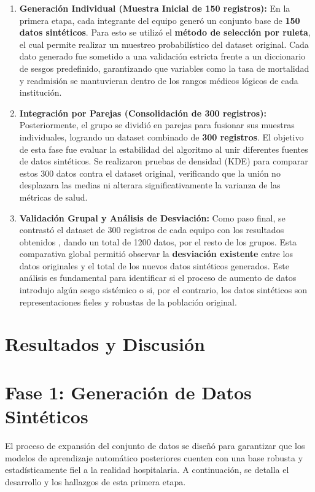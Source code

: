 \documentclass[12pt]{article}
\begin{document}
\begin{enumerate}
    \item \textbf{Generación Individual (Muestra Inicial de 150 registros):} 
    En la primera etapa, cada integrante del equipo generó un conjunto base de \textbf{150 datos sintéticos}. Para esto se utilizó el \textbf{método de selección por ruleta}, el cual permite realizar un muestreo probabilístico del dataset original. Cada dato generado fue sometido a una validación estricta frente a un diccionario de sesgos predefinido, garantizando que variables como la tasa de mortalidad y readmisión se mantuvieran dentro de los rangos médicos lógicos de cada institución.

    \item \textbf{Integración por Parejas (Consolidación de 300 registros):} 
    Posteriormente, el grupo se dividió en parejas para fusionar sus muestras individuales, logrando un dataset combinado de \textbf{300 registros}. El objetivo de esta fase fue evaluar la estabilidad del algoritmo al unir diferentes fuentes de datos sintéticos. Se realizaron pruebas de densidad (KDE) para comparar estos 300 datos contra el dataset original, verificando que la unión no desplazara las medias ni alterara significativamente la varianza de las métricas de salud.

    \item \textbf{Validación Grupal y Análisis de Desviación:} 
    Como paso final, se contrastó el dataset de 300 registros de cada equipo con los resultados obtenidos , dando un total de 1200 datos, por el resto de los grupos. Esta comparativa global permitió observar la \textbf{desviación existente} entre los datos originales y el total de los nuevos datos sintéticos generados. Este análisis es fundamental para identificar si el proceso de aumento de datos introdujo algún sesgo sistémico o si, por el contrario, los datos sintéticos son representaciones fieles y robustas de la población original.
\end{enumerate}

\section{Resultados y Discusión}

\section*{Fase 1: Generación de Datos Sintéticos}

El proceso de expansión del conjunto de datos se diseñó para garantizar que los modelos de aprendizaje automático posteriores cuenten con una base robusta y estadísticamente fiel a la realidad hospitalaria. A continuación, se detalla el desarrollo y los hallazgos de esta primera etapa.
\end{document}

